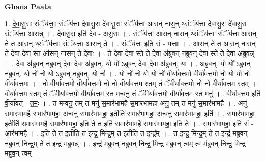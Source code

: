\documentclass[17pt]{extarticle}
\begin{document}
\textbf{Ghana Paata } \newline

1. दे॒वा॒सु॒राः संॅय॑त्ताः॒ संॅय॑त्ता देवासु॒रा दे॑वासु॒राः संॅय॑त्ता आसन् नास॒न् थ्संॅय॑त्ता देवासु॒रा दे॑वासु॒राः संॅय॑त्ता आसन्न् । . दे॒वा॒सु॒रा इति॑ देव - अ॒सु॒राः । . संॅय॑त्ता आसन् नास॒न् थ्संॅय॑त्ताः॒ संॅय॑त्ता आस॒न् ते त आ॑स॒न् थ्संॅय॑त्ताः॒ संॅय॑त्ता आस॒न् ते । . संॅय॑त्ता॒ इति॒ सं - य॒त्ताः॒ । . आ॒स॒न् ते त आ॑सन् नास॒न् ते दे॒वा दे॒वा स्त आ॑सन् नास॒न् ते दे॒वाः । . ते दे॒वा दे॒वा स्ते ते दे॒वा अ॑ब्रुवन् नब्रुवन् दे॒वा स्ते ते दे॒वा अ॑ब्रुवन्न् । . दे॒वा अ॑ब्रुवन् नब्रुवन् दे॒वा दे॒वा अ॑ब्रुव॒न्॒. यो यो᳚ ऽब्रुवन् दे॒वा दे॒वा अ॑ब्रुव॒न्॒. यः । . अ॒ब्रु॒व॒न्॒. यो यो᳚ ऽब्रुवन् नब्रुव॒न्॒. यो नो॑ नो॒ यो᳚ ऽब्रुवन् नब्रुव॒न्॒. यो नः॑ । . यो नो॑ नो॒ यो यो नो॑ वी॒र्या॑वत्तमो वी॒र्या॑वत्तमो नो॒ यो यो नो॑ वी॒र्या॑वत्तमः । . नो॒ वी॒र्या॑वत्तमो वी॒र्या॑वत्तमो नो नो वी॒र्या॑वत्तम॒ स्तम् तं ॅवी॒र्या॑वत्तमो नो नो वी॒र्या॑वत्तम॒ स्तम् । . वी॒र्या॑वत्तम॒ स्तम् तं ॅवी॒र्या॑वत्तमो वी॒र्या॑वत्तम॒ स्त मन्वनु॒ तं ॅवी॒र्या॑वत्तमो वी॒र्या॑वत्तम॒ स्त मनु॑ । . वी॒र्या॑वत्तम॒ इति॑ वी॒र्या॑वत् - त॒मः॒ । . त मन्वनु॒ तम् त मनु॑ स॒मार॑भामहै स॒मार॑भामहा॒ अनु॒ तम् त मनु॑ स॒मार॑भामहै । . अनु॑ स॒मार॑भामहै स॒मार॑भामहा॒ अन्वनु॑ स॒मार॑भामहा॒ इतीति॑ स॒मार॑भामहा॒ अन्वनु॑ स॒मार॑भामहा॒ इति॑ । . स॒मार॑भामहा॒ इतीति॑ स॒मार॑भामहै स॒मार॑भामहा॒ इति॒ ते त इति॑ स॒मार॑भामहै स॒मार॑भामहा॒ इति॒ ते । . स॒मार॑भामहा॒ इति॑ सं - आर॑भामहै । . इति॒ ते त इतीति॒ त इन्द्र॒ मिन्द्र॒म् त इतीति॒ त इन्द्र᳚म् । . त इन्द्र॒ मिन्द्र॒म् ते त इन्द्र॑ मब्रुवन् नब्रुव॒न् निन्द्र॒म् ते त इन्द्र॑ मब्रुवन्न् । . इन्द्र॑ मब्रुवन् नब्रुव॒न् निन्द्र॒ मिन्द्र॑ मब्रुव॒न् त्वम् त्व म॑ब्रुव॒न् निन्द्र॒ मिन्द्र॑ मब्रुव॒न् त्वम् । \newline
\end{document}
